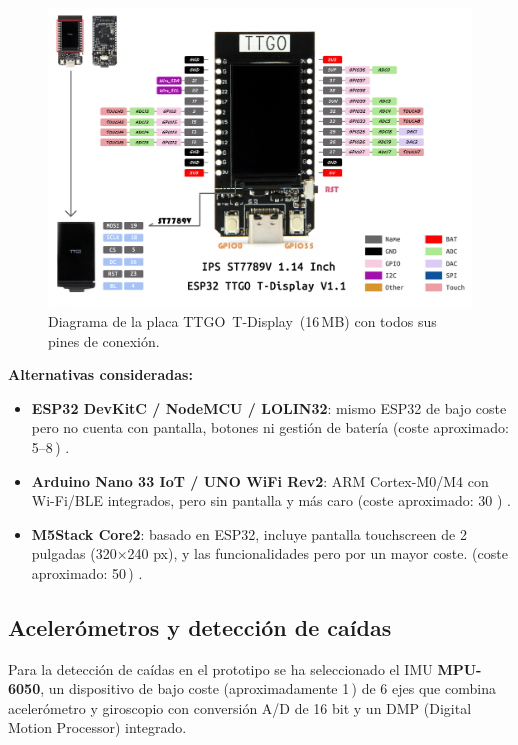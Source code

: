 \documentclass[12pt, a4paper]{article}
\begin{document}
	\begin{figure}[htbp]
		\centering
		\includegraphics[width=1\textwidth]{images/TTGO_T-Display.jpg}
		\caption[Diagrama de pines de la TTGO T-Display]{Diagrama de la placa \mbox{TTGO T-Display (16\,MB)} con todos sus pines de conexión.}
		\label{fig:ttgo_tdisplay_pines}
	\end{figure}
	
	\noindent\textbf{Alternativas consideradas:}
	\begin{itemize}
		\item \textbf{ESP32 DevKitC / NodeMCU / LOLIN32}: mismo ESP32 de bajo coste pero no cuenta con pantalla, botones ni gestión de batería (coste aproximado: 5–8\,\texteuro{}) \cite{ESP32DevKitC2018}.
		\item \textbf{Arduino Nano 33 IoT / UNO WiFi Rev2}: ARM Cortex-M0/M4 con Wi-Fi/BLE integrados, pero sin pantalla y más caro (coste aproximado: 30 \texteuro{}) \cite{ArduinoNano33IoT2019}.
		\item \textbf{M5Stack Core2}: basado en ESP32, incluye pantalla touchscreen de 2 pulgadas (320×240 px), y las funcionalidades pero por un mayor coste. (coste aproximado: 50\,\texteuro{}) \cite{M5StackCore22020}.
	\end{itemize}
	
	
	\subsection{Acelerómetros y detección de caídas}
	
	Para la detección de caídas en el prototipo se ha seleccionado el IMU \textbf{MPU-6050}, un dispositivo de bajo coste (aproximadamente 1\,\texteuro{}) de 6 ejes que combina acelerómetro y giroscopio con conversión A/D de 16 bit y un DMP (Digital Motion Processor) integrado. 	
	
\end{document}
